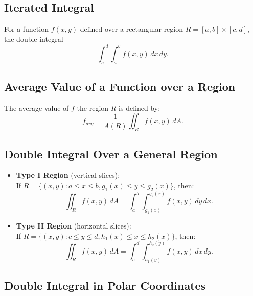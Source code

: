 \documentclass[a4paper,11pt]{article}
\begin{document}


\subsection{Iterated Integral}

\begin{tcolorbox}
    For a function $f(x,y)$ defined over a rectangular region $R=[a,b]\times[c,d]$, the double integral
    \[
    \int_c^d\int_a^b f(x,y) \, dx \, dy.
    \]
\end{tcolorbox}




\subsection{Average Value of a Function over a Region}

\begin{tcolorbox}
    The average value of $f$ the region $R$ is defined by:
    \[
    f_{avg} = \frac{1}{A(R)} \iint_R f(x,y) \, dA.
    \]
\end{tcolorbox}




\subsection{Double Integral Over a General Region}

\begin{tcolorbox}
    \begin{itemize}
        \item \textbf{Type I Region} (vertical slices):\\
        If $R=\{(x,y) : a \leq x \leq b, g_1(x) \leq y \leq g_2(x)\}$, then:
        \[
        \iint_R f(x,y) \, dA = \int_a^b \int_{g_1(x)}^{g_2(x)} f(x,y) \, dy \, dx.
        \]
        \item \textbf{Type II Region} (horizontal slices):\\
        If $R=\{(x,y) : c \leq y \leq d, h_1(x) \leq x \leq h_2(x)\}$, then:
        \[
        \iint_R f(x,y) \, dA = \int_c^d \int_{h_1(y)}^{h_2(y)} f(x,y) \, dx \, dy.
        \]
    \end{itemize}
\end{tcolorbox}




\subsection{Double Integral in Polar Coordinates}
\end{document}
